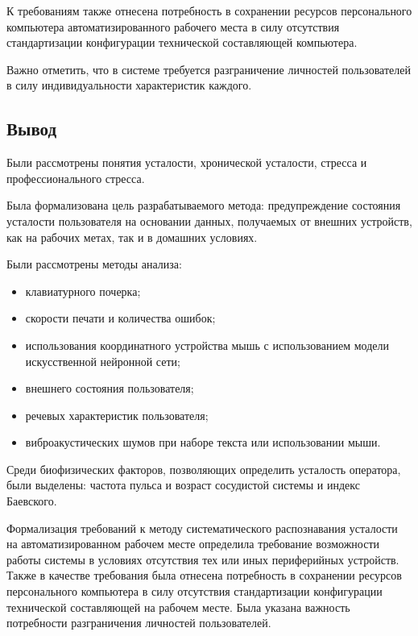 К требованиям также отнесена потребность в сохранении ресурсов персонального компьютера автоматизированного рабочего места в силу отсутствия стандартизации конфигурации технической составляющей компьютера.

Важно отметить, что в системе требуется разграничение личностей пользователей в силу индивидуальности характеристик каждого.

\subsection*{Вывод}
Были рассмотрены понятия усталости, хронической усталости, стресса и профессионального стресса.

Была формализована цель разрабатываемого метода: предупреждение состояния усталости пользователя на основании данных, получаемых от внешних устройств, как на рабочих метах, так и в домашних условиях.

Были рассмотрены методы анализа:

\begin{itemize}[leftmargin=1.6\parindent]
\item клавиатурного почерка;
\item скорости печати и количества ошибок;
\item использования координатного устройства мышь с использованием модели искусственной нейронной сети;
\item внешнего состояния пользователя;
\item речевых характеристик пользователя;
\item виброакустических шумов при наборе текста или использовании мыши.
\end{itemize}

Среди биофизических факторов, позволяющих определить усталость оператора, были выделены: частота пульса и возраст сосудистой системы и индекс Баевского.

Формализация требований к методу систематического распознавания усталости на автоматизированном рабочем месте определила требование  возможности работы системы в условиях отсутствия тех или иных периферийных устройств. Также в качестве требования была отнесена потребность в сохранении ресурсов персонального компьютера в силу отсутствия стандартизации конфигурации технической составляющей на рабочем месте. Была указана важность потребности разграничения личностей пользователей.

\pagebreak